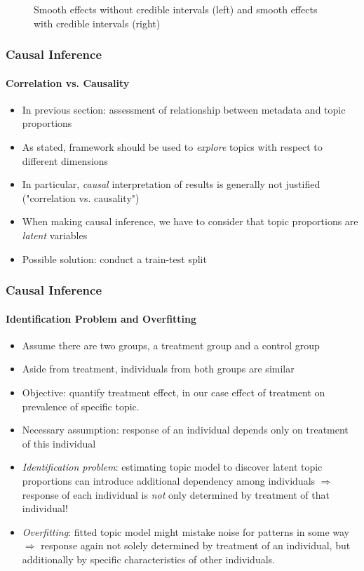 \documentclass[xcolor=dvipsnames]{beamer}
\begin{document}
\begin{frame}
\begin{figure}[h!]
\begin{subfigure}[b]{0.4\linewidth}
  \end{subfigure}
  \caption{Smooth effects without credible intervals (left) and smooth effects with credible intervals (right)}
  \label{fig:directassessment}
\end{figure}
\end{frame}

\begin{frame}
\frametitle{Causal Inference}
\framesubtitle{Correlation vs. Causality}
\begin{itemize}
\item In previous section: assessment of relationship between metadata and topic proportions
\item As stated, framework should be used to \textit{explore} topics with respect to different dimensions
\item In particular, \textit{causal} interpretation of results is generally not justified ("correlation vs. causality")
\item When making causal inference, we have to consider that topic proportions are \textit{latent} variables 
\item Possible solution: conduct a train-test split
\end{itemize}
\end{frame}

\begin{frame}
\frametitle{Causal Inference}
\framesubtitle{Identification Problem and Overfitting}
\begin{itemize}
\item Assume there are two groups, a treatment group and a control group
\item Aside from treatment, individuals from both groups are similar
\item Objective: quantify treatment effect, in our case effect of treatment on prevalence of specific topic.
\item Necessary assumption: response of an individual depends only on treatment of this individual
\item \textit{Identification problem}: estimating topic model to discover latent topic proportions can introduce additional dependency among individuals $\Rightarrow$ response of each individual is \textit{not} only determined by treatment of that individual!
\item \textit{Overfitting}: fitted topic model might mistake noise for patterns in some way $\Rightarrow$ response again not solely determined by treatment of an individual, but additionally by specific characteristics of other individuals.
\end{itemize}
\end{frame}
\end{document}
